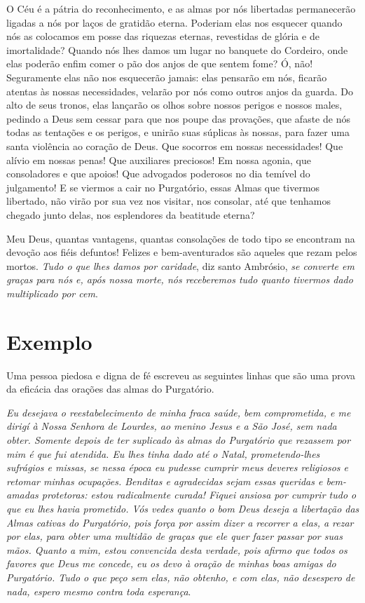 O Céu é a pátria do reconhecimento, e as almas por nós libertadas permanecerão ligadas a nós por laços de gratidão eterna. Poderiam elas nos esquecer quando nós as colocamos em posse das riquezas eternas, revestidas de glória e de imortalidade? Quando nós lhes damos um lugar no banquete do Cordeiro, onde elas poderão enfim comer o pão dos anjos de que sentem fome? Ó, não! Seguramente elas não nos esquecerão jamais: elas pensarão em nós, ficarão atentas às nossas necessidades, velarão por nós como outros anjos da guarda. Do alto de seus tronos, elas lançarão os olhos sobre nossos perigos e nossos males, pedindo a Deus sem cessar para que nos poupe das provações, que afaste de nós todas as tentações e os perigos, e unirão suas súplicas às nossas, para fazer uma santa violência ao coração de Deus. Que socorros em nossas necessidades! Que alívio em nossas penas! Que auxiliares preciosos! Em nossa agonia, que consoladores e que apoios! Que advogados poderosos no dia temível do julgamento! E se viermos a cair no Purgatório, essas Almas que tivermos libertado, não virão por sua vez nos visitar, nos consolar, até que tenhamos chegado junto delas, nos esplendores da beatitude eterna? 

Meu Deus, quantas vantagens, quantas consolações de todo tipo se encontram na devoção aos fiéis defuntos! Felizes e bem-aventurados são aqueles que rezam pelos mortos. \textit{Tudo o que lhes damos por caridade}, diz santo Ambrósio, \textit{se converte em graças para nós e, após nossa morte, nós receberemos tudo quanto tivermos dado multiplicado por cem}.


\section*{Exemplo}

Uma pessoa piedosa e digna de fé escreveu as seguintes linhas que são uma prova da eficácia das orações das almas do Purgatório. 

\textit{Eu desejava o reestabelecimento de minha fraca saúde, bem comprometida, e me dirigí à Nossa Senhora de Lourdes, ao menino Jesus e a São José, sem nada obter. Somente depois de ter suplicado às almas do Purgatório que rezassem por mim é que fui atendida. Eu lhes tinha dado até o Natal, prometendo-lhes sufrágios e missas, se nessa época eu pudesse cumprir meus deveres religiosos e retomar minhas ocupações. Benditas e agradecidas sejam essas queridas e bem-amadas protetoras: estou radicalmente curada! Fiquei ansiosa por cumprir tudo o que eu lhes havia prometido. Vós vedes quanto o bom Deus deseja a libertação das Almas cativas do Purgatório, pois força por assim dizer a recorrer a elas, a rezar por elas, para obter uma multidão de graças que ele quer fazer passar por suas mãos. Quanto a mim, estou convencida desta verdade, pois afirmo que todos os favores que Deus me concede, eu os devo à oração de minhas boas amigas do Purgatório. Tudo o que peço sem elas, não obtenho, e com elas, não desespero de nada, espero mesmo contra toda esperança}. 

